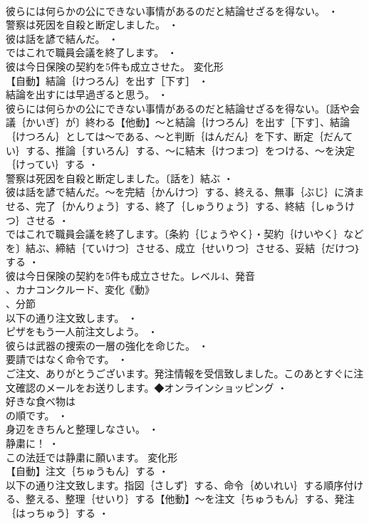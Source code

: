 \documentclass[8pt]{extreport}
\begin{document}
\begin{CJK}{UTF8}{min}
\\	彼らには何らかの公にできない事情があるのだと結論せざるを得ない。 ・
\\	警察は死因を自殺と断定しました。 ・
\\	彼は話を諺で結んだ。 ・
\\	ではこれで職員会議を終了します。 ・
\\	彼は今日保険の契約を5件も成立させた。	変化形 
\\	【自動】結論｛けつろん｝を出す［下す］ ・
\\	結論を出すには早過ぎると思う。 ・
\\	彼らには何らかの公にできない事情があるのだと結論せざるを得ない。〔話や会議｛かいぎ｝が〕終わる【他動】～と結論｛けつろん｝を出す［下す］、結論｛けつろん｝としては～である、～と判断｛はんだん｝を下す、断定｛だんてい｝する、推論｛すいろん｝する、～に結末｛けつまつ｝をつける、～を決定｛けってい｝する ・
\\	警察は死因を自殺と断定しました。〔話を〕結ぶ ・
\\	彼は話を諺で結んだ。～を完結｛かんけつ｝する、終える、無事｛ぶじ｝に済ませる、完了｛かんりょう｝する、終了｛しゅうりょう｝する、終結｛しゅうけつ｝させる ・
\\	ではこれで職員会議を終了します。〔条約｛じょうやく｝・契約｛けいやく｝などを〕結ぶ、締結｛ていけつ｝させる、成立｛せいりつ｝させる、妥結｛だけつ｝する ・
\\	彼は今日保険の契約を5件も成立させた。レベル4、発音
\\	、カナコンクルード、変化《動》
\\	、分節
\\	以下の通り注文致します。 ・
\\	ピザをもう一人前注文しよう。 ・
\\	彼らは武器の捜索の一層の強化を命じた。 ・
\\	要請ではなく命令です。 ・
\\	ご注文、ありがとうございます。発注情報を受信致しました。このあとすぐに注文確認のメールをお送りします。◆オンラインショッピング ・
\\	好きな食べ物は
\\	の順です。 ・
\\	身辺をきちんと整理しなさい。 ・
\\	静粛に！ ・
\\	この法廷では静粛に願います。	変化形 
\\	【自動】注文｛ちゅうもん｝する ・
\\	以下の通り注文致します。指図｛さしず｝する、命令｛めいれい｝する順序付ける、整える、整理｛せいり｝する【他動】～を注文｛ちゅうもん｝する、発注｛はっちゅう｝する ・

\end{CJK}
\end{document}
